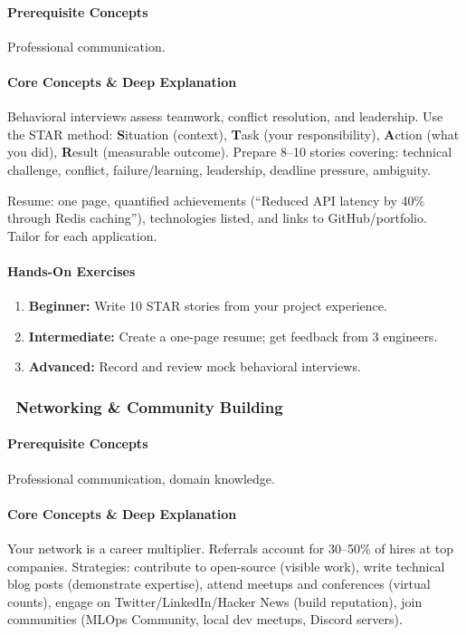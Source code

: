 \documentclass[11pt, a4paper, oneside]{report}
\newcommand{\mustmaster}[1]{\subsubsection{\texorpdfstring{\fcolorbox{blue!40!black}{blue!8}{\footnotesize\bfseries\color{blue!40!black} MUST MASTER}~#1}{#1}}}
\begin{document}
\paragraph{Prerequisite Concepts} Professional communication.

\paragraph{Core Concepts \& Deep Explanation} Behavioral interviews assess teamwork, conflict resolution, and leadership. Use the STAR method: \textbf{S}ituation (context), \textbf{T}ask (your responsibility), \textbf{A}ction (what you did), \textbf{R}esult (measurable outcome). Prepare 8--10 stories covering: technical challenge, conflict, failure/learning, leadership, deadline pressure, ambiguity.

Resume: one page, quantified achievements (``Reduced API latency by 40\% through Redis caching''), technologies listed, and links to GitHub/portfolio. Tailor for each application.

\paragraph{Hands-On Exercises}
\begin{enumerate}[leftmargin=*]
\item \textbf{Beginner:} Write 10 STAR stories from your project experience.
\item \textbf{Intermediate:} Create a one-page resume; get feedback from 3 engineers.
\item \textbf{Advanced:} Record and review mock behavioral interviews.
\end{enumerate}

\mustmaster{Networking \& Community Building}

\paragraph{Prerequisite Concepts} Professional communication, domain knowledge.

\paragraph{Core Concepts \& Deep Explanation} Your network is a career multiplier. Referrals account for 30--50\% of hires at top companies. Strategies: contribute to open-source (visible work), write technical blog posts (demonstrate expertise), attend meetups and conferences (virtual counts), engage on Twitter/LinkedIn/Hacker News (build reputation), join communities (MLOps Community, local dev meetups, Discord servers).
\end{document}
